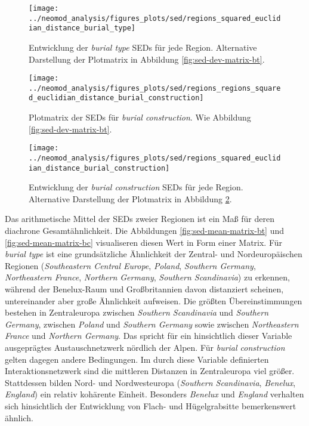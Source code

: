 \documentclass[openany,twoside,twocolumn]{book}
\begin{document}
\begin{figure}[!t]

{\centering \texttt{[image: ../neomod\_analysis/figures\_plots/sed/regions\_squared\_euclidian\_distance\_burial\_type]} 

}

\caption[Entwicklung der \textit{burial type} SEDs für jede Region]{Entwicklung der \textit{burial type} SEDs für jede Region. Alternative Darstellung der Plotmatrix in Abbildung \ref{fig:sed-dev-matrix-bt}.}\label{fig:sed-dev-bt}
\end{figure}

\begin{figure}
\texttt{[image: ../neomod\_analysis/figures\_plots/sed/regions\_regions\_squared\_euclidian\_distance\_burial\_construction]} \caption[Plotmatrix der SEDs für \textit{burial construction}]{Plotmatrix der SEDs für \textit{burial construction}. Wie Abbildung \ref{fig:sed-dev-matrix-bt}.}\label{fig:sed-dev-matrix-bc}
\end{figure}

\begin{figure}[!t]

{\centering \texttt{[image: ../neomod\_analysis/figures\_plots/sed/regions\_squared\_euclidian\_distance\_burial\_construction]} 

}

\caption[Entwicklung der \textit{burial construction} SEDs für jede Region]{Entwicklung der \textit{burial construction} SEDs für jede Region. Alternative Darstellung der Plotmatrix in Abbildung \ref{fig:sed-dev-matrix-bc}.}\label{fig:sed-dev-bc}
\end{figure}

Das arithmetische Mittel der SEDs zweier Regionen ist ein Maß für deren
diachrone Gesamtähnlichkeit. Die Abbildungen
\ref{fig:sed-mean-matrix-bt} und \ref{fig:sed-mean-matrix-bc}
visualiseren diesen Wert in Form einer Matrix. Für \emph{burial type}
ist eine grundsätzliche Ähnlichkeit der Zentral- und Nordeuropäischen
Regionen (\emph{Southeastern Central Europe}, \emph{Poland},
\emph{Southern Germany}, \emph{Northeastern France}, \emph{Northern
Germany}, \emph{Southern Scandinavia}) zu erkennen, während der
Benelux-Raum und Großbritannien davon distanziert scheinen,
untereinander aber große Ähnlichkeit aufweisen. Die größten
Übereinstimmungen bestehen in Zentraleuropa zwischen \emph{Southern
Scandinavia} und \emph{Southern Germany}, zwischen \emph{Poland} und
\emph{Southern Germany} sowie zwischen \emph{Northeastern France} und
\emph{Northern Germany}. Das spricht für ein hinsichtlich dieser
Variable ausgeprägtes Austauschnetzwerk nördlich der Alpen. Für
\emph{burial construction} gelten dagegen andere Bedingungen. Im durch
diese Variable definierten Interaktionsnetzwerk sind die mittleren
Distanzen in Zentraleuropa viel größer. Stattdessen bilden Nord- und
Nordwesteuropa (\emph{Southern Scandinavia}, \emph{Benelux},
\emph{England}) ein relativ kohärente Einheit. Besonders \emph{Benelux}
und \emph{England} verhalten sich hinsichtlich der Entwicklung von
Flach- und Hügelgrabsitte bemerkenswert ähnlich.
\end{document}

